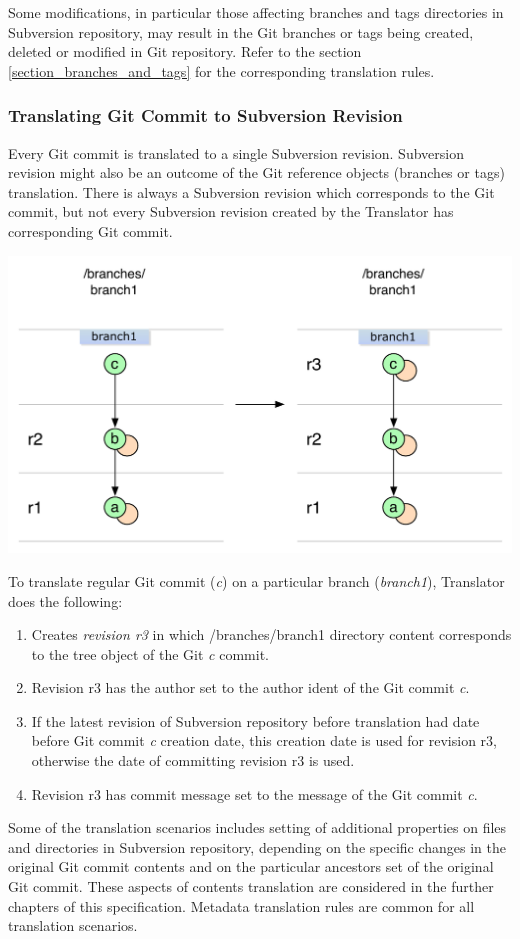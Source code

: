 Some modifications, in particular those affecting branches and tags directories in Subversion repository, may
result in the Git branches or tags being created, deleted or modified in Git repository. Refer to the section \ref{section_branches_and_tags} for the corresponding translation rules. 

\subsubsection{Translating Git Commit to Subversion Revision}
Every Git commit is translated to a single Subversion revision. Subversion revision might also be an outcome of 
the Git reference objects (branches or tags) translation. There is always a Subversion revision
which corresponds to the Git commit, but not every Subversion revision created by the Translator has 
corresponding Git commit.
\begin{center}
\includegraphics[width=\textwidth]{img/diagrams/single_change_git_to_svn.pdf}%
\label{single_change_git_to_svn}%
\end{center}

To translate regular Git commit (\emph{c}) on a particular branch (\emph{branch1}), Translator does 
the following:
\begin{enumerate}
	\compactlist
	\item Creates \emph{revision r3} in which /branches/branch1 directory content corresponds to the tree object of the Git \emph{c} commit. 
	\item Revision r3 has the author set to the author ident of the Git commit \emph{c}.
	\item If the latest revision of Subversion repository before translation had date before Git commit \emph{c} creation date, this creation date is used for revision r3, otherwise the date of committing revision r3 is used.
	\item Revision r3 has commit message set to the message of the Git commit \emph{c}.
\end{enumerate}

Some of the translation scenarios includes setting of additional properties on files and directories 
in Subversion repository, depending on the specific changes in the original Git commit contents and 
on the particular ancestors set of the original Git commit. These aspects of contents translation are considered in the further chapters of
this specification. Metadata translation rules are common for all translation scenarios.